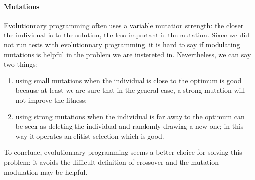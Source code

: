\documentclass{report}
\begin{document}
\paragraph{Mutations}
Evolutionnary programming often uses a variable mutation strength: the closer the individual is to the solution, the less important is the mutation. Since we did not run tests with evolutionnary programming, it is hard to say if modulating mutations is helpful in the problem we are instereted in. Nevertheless, we can say two things:
\begin{enumerate}
\item using small mutations when the individual is close to the optimum is good because at least we are sure that in the general case, a strong mutation will not improve the fitness;
\item using strong mutations when the individual is far away to the optimum can be seen as deleting the individual and randomly drawing a new one; in this way it operates an elitist selection which is good.
\end{enumerate}



To conclude, evolutionnary programming seems a better choice for solving this problem: it avoids the difficult definition of crossover and the mutation modulation may be helpful.
\end{document}
